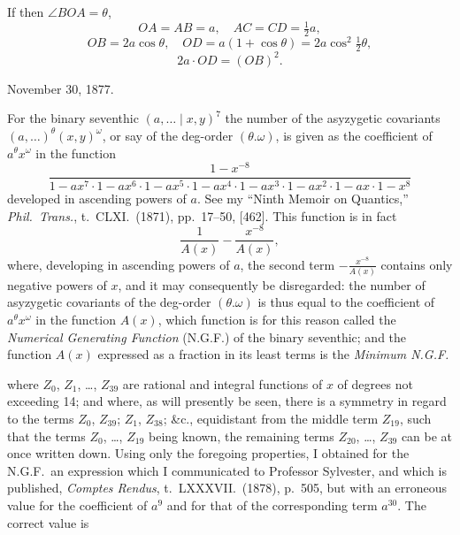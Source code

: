 \documentclass[11pt,a4paper]{book}
\begin{document}
If then $\angle BOA = \theta$,
\[
OA = AB = a, \quad AC = CD = \tfrac{1}{2}a,
\]
\[
OB = 2a\cos\theta, \quad OD = a(1 + \cos\theta) = 2a\cos^2\tfrac{1}{2}\theta,
\]
\[
2a \cdot OD = (OB)^2.
\]

November 30, 1877.

\clearpage

For the binary seventhic $(a, \dots \mid x, y)^7$ the number of the asyzygetic covariants $(a, \dots)^\theta(x, y)^\omega$, or say of the deg-order $(\theta . \omega)$, is given as the coefficient of $a^\theta x^\omega$ in the function
\[
\frac{1 - x^{-8}}{1 - ax^7 \cdot 1 - ax^6 \cdot 1 - ax^5 \cdot 1 - ax^4 \cdot 1 - ax^3 \cdot 1 - ax^2 \cdot 1 - ax \cdot 1 - x^8}
\]
developed in ascending powers of $a$. See my ``Ninth Memoir on Quantics,'' \textit{Phil.\ Trans.}, t.\ CLXI.\ (1871), pp.\ 17--50, [462]. This function is in fact
\[
\frac{1}{A(x)} - \frac{x^{-8}}{A(x)},
\]
where, developing in ascending powers of $a$, the second term $-\frac{x^{-8}}{A(x)}$ contains only negative powers of $x$, and it may consequently be disregarded: the number of asyzygetic covariants of the deg-order $(\theta . \omega)$ is thus equal to the coefficient of $a^\theta x^\omega$ in the function $A(x)$, which function is for this reason called the \textit{Numerical Generating Function} (N.G.F.) of the binary seventhic; and the function $A(x)$ expressed as a fraction in its least terms is the \textit{Minimum N.G.F.}

\clearpage
where $Z_0$, $Z_1$, \dots, $Z_{39}$ are rational and integral functions of $x$ of degrees not exceeding 14; and where, as will presently be seen, there is a symmetry in regard to the terms $Z_0$, $Z_{39}$; $Z_1$, $Z_{38}$; \&c., equidistant from the middle term $Z_{19}$, such that the terms $Z_0$, \dots, $Z_{19}$ being known, the remaining terms $Z_{20}$, \dots, $Z_{39}$ can be at once written down. Using only the foregoing properties, I obtained for the N.G.F.\ an expression which I communicated to Professor Sylvester, and which is published, \textit{Comptes Rendus}, t.\ LXXXVII.\ (1878), p.\ 505, but with an erroneous value for the coefficient of $a^9$ and for that of the corresponding term $a^{30}$. The correct value is
\end{document}
